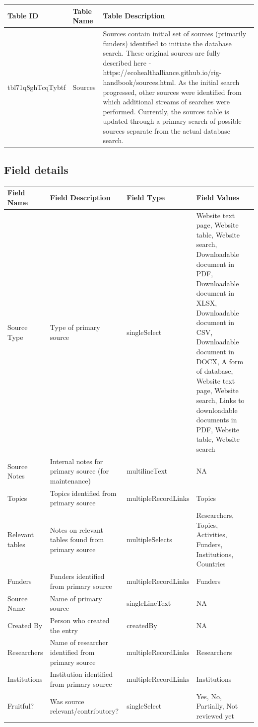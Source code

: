 \documentclass[
]{book}
\begin{document}
\begin{table}
\centering
\begin{tabular}{l|l|l}
\hline
\textbf{Table ID} & \textbf{Table Name} & \textbf{Table Description}\\
\hline
tbl71q8ghTcqTybtf & Sources & Sources contain initial set of sources (primarily funders) identified to initiate the database search. These original sources are fully described here - https://ecohealthalliance.github.io/rig-handbook/sources.html. As the initial search progressed, other sources were identified from which additional streams of searches were performed. Currently, the sources table is updated through a primary search of possible sources separate from the actual database search.\\
\hline
\end{tabular}
\end{table}

\hypertarget{field-details-4}{%
\subsection{Field details}\label{field-details-4}}

\begin{table}
\centering
\begin{tabular}{l|l|l|l}
\hline
\textbf{Field Name} & \textbf{Field Description} & \textbf{Field Type} & \textbf{Field Values}\\
\hline
Source Type & Type of primary source & singleSelect & Website text page, Website table, Website search, Downloadable document in PDF, Downloadable document in XLSX, Downloadable document in CSV, Downloadable document in DOCX, A form of database, Website text page, Website search, Links to downloadable documents in PDF, Website table, Website search\\
\hline
Source Notes & Internal notes for primary source (for maintenance) & multilineText & NA\\
\hline
Topics & Topics identified from primary source & multipleRecordLinks & Topics\\
\hline
Relevant tables & Notes on relevant tables found from primary source & multipleSelects & Researchers, Topics, Activities, Funders, Institutions, Countries\\
\hline
Funders & Funders identified from primary source & multipleRecordLinks & Funders\\
\hline
Source Name & Name of primary source & singleLineText & NA\\
\hline
Created By & Person who created the entry & createdBy & NA\\
\hline
Researchers & Name of researcher identified from primary source & multipleRecordLinks & Researchers\\
\hline
Institutions & Institution identified from primary source & multipleRecordLinks & Institutions\\
\hline
Fruitful? & Was source relevant/contributory? & singleSelect & Yes, No, Partially, Not reviewed yet\\
\hline
\end{tabular}
\end{table}
\end{document}
